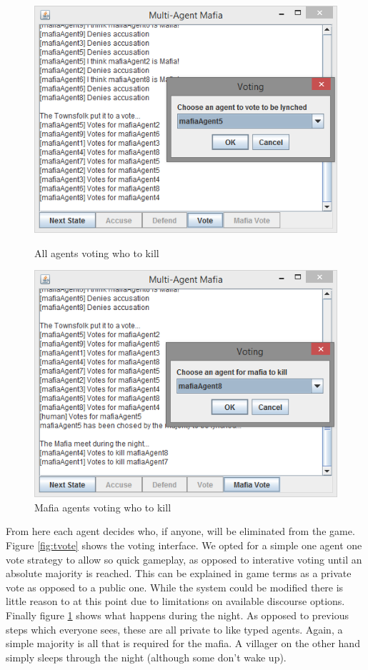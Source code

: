 \documentclass[12pt]{article} %
\begin{document}
\begin{figure}[H]
\centering
\begin{minipage}{0.49\textwidth}
\centering
\includegraphics[width=\linewidth]{mafia-townvote}
\caption{All agents voting who to kill}
\label{fig:tvote}
\end{minipage}\hfill
\begin{minipage}{0.49\textwidth}
\centering
\includegraphics[width=\linewidth]{mafia-mafiavote}
\caption{Mafia agents voting who to kill}
\label{fig:mvote}
\end{minipage}
\end{figure}

From here each agent decides who, if anyone, will be eliminated from the game. Figure \ref{fig:tvote} shows the voting interface. We opted for a simple one agent one vote strategy to allow so quick gameplay, as opposed to interative voting until an absolute majority is reached. This can be explained in game terms as a private vote as opposed to a public one. While the system could be modified there is little reason to at this point due to limitations on available discourse options. Finally figure \ref{fig:mvote} shows what happens during the night. As opposed to previous steps which everyone sees, these are all private to like typed agents. Again, a simple majority is all that is required for the mafia. A villager on the other hand simply sleeps through the night (although some don't wake up).
\end{document}
